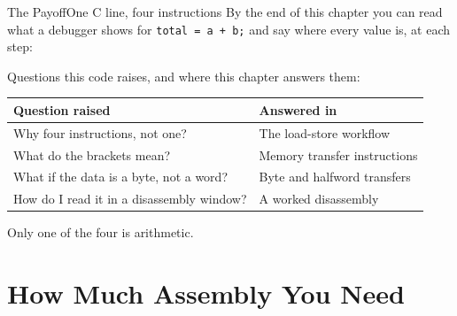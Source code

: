 \documentclass[9pt,aspectratio=169,xcolor=table]{beamer}
\begin{document}
{\beamerextras
\begin{frame}[fragile]{The Payoff}{One C line, four instructions}
    \leavevmode
    By the end of this chapter you can read what a debugger shows for \texttt{total = a + b;} and say where every value is, at each step:

    \vspace{2mm}
    \begin{center}
    \begin{minipage}{.9\textwidth}
    \end{minipage}
    \end{center}

    \vspace{2mm}
    {\small Questions this code raises, and where this chapter answers them:}

    \vspace{1mm}
    \begin{center}
    {\small
    \striped
    \begin{tabular}{@{}l R{.52\textwidth}@{}}
        \toprule
        \textbf{Question raised} & \textbf{Answered in} \\
        \midrule
        Why four instructions, not one? & The load-store workflow \\
        What do the brackets mean? & Memory transfer instructions \\
        What if the data is a byte, not a word? & Byte and halfword transfers \\
        How do I read it in a disassembly window? & A worked disassembly \\
        \bottomrule
    \end{tabular}}
    \end{center}
    \vspace{2mm}
    {\small\centering Only one of the four is arithmetic.\par}
\end{frame}
}


\section{How Much Assembly You Need}
\end{document}
